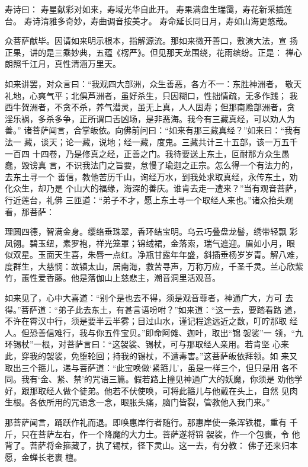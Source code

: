 寿诗曰：
寿星献彩对如来，寿域光华自此开。
寿果满盘生瑞霭，寿花新采插莲台。
寿诗清雅多奇妙，寿曲调音按美才。
寿命延长同日月，寿如山海更悠哉。

众菩萨献毕。因请如来明示根本，指解源流。那如来微开善口，敷演大法，宣
扬正果，讲的是三乘妙典，五蕴《楞严》。但见那天龙围绕，花雨缤纷。正是：
禅心朗照千江月，真性清涵万里天。

如来讲罢，对众言曰：“我观四大部洲，众生善恶，各方不一：东胜神洲者，
敬天礼地，心爽气平；北俱芦洲者，虽好杀生，只因糊口，性拙情疏，无多作践；
我西牛贺洲者，不贪不杀，养气潜灵，虽无上真，人人固寿；但那南赡部洲者，贪
淫乐祸，多杀多争，正所谓口舌凶场，是非恶海。我今有三藏真经，可以劝人为善。”
诸菩萨闻言，合掌皈依。向佛前问曰：“如来有那三藏真经？”如来曰：“我有法一
藏，谈天；论一藏，说地；经一藏，度鬼。三藏共计三十五部，该一万五千一百四
十四卷，乃是修真之经，正善之门。我待要送上东土，叵耐那方众生愚蠢，毁谤真
言，不识我法门之旨要，怠慢了瑜迦之正宗。怎么得一个有法力的，去东土寻一个
善信，教他苦历千山，询经万水，到我处求取真经，永传东土，劝化众生，却乃是
个山大的福缘，海深的善庆。谁肯去走一遭来？”当有观音菩萨，行近莲台，礼佛
三匝道：“弟子不才，愿上东土寻一个取经人来也。”诸众抬头观看，那菩萨：

理圆四德，智满金身。缨络垂珠翠，香环结宝明。乌云巧叠盘龙髻，绣带轻飘
彩凤翎。碧玉纽，素罗袍，祥光笼罩；锦绒裙，金落索，瑞气遮迎。眉如小月，眼
似双星。玉面天生喜，朱唇一点红。净瓶甘露年年盛，斜插垂杨岁岁青。解八难，
度群生，大慈悯：故镇太山，居南海，救苦寻声，万称万应，千圣千灵。兰心欣紫
竹，蕙性爱香藤。他是落伽山上慈悲主，潮音洞里活观音。

如来见了，心中大喜道：“别个是也去不得，须是观音尊者，神通广大，方可
去得。”菩萨道：“弟子此去东土，有甚言语吩咐？”如来道：“这一去，要踏看路
道，不许在霄汉中行，须是要半云半雾；目过山水，谨记程途远近之数，叮咛那取
经人。但恐善信难行，我与你五件宝贝。”即命阿傩、迦叶，取出“锦袈裟”一
领，“九环锡杖”一根，对菩萨言曰：“这袈裟、锡杖，可与那取经人亲用。若肯坚
心来此，穿我的袈裟，免堕轮回；持我的锡杖，不遭毒害。”这菩萨皈依拜领。如
来又取出三个箍儿，递与菩萨道：“此宝唤做‘紧箍儿’，虽是一样三个，但只是用
各不同。我有‘金、紧、禁’的咒语三篇。假若路上撞见神通广大的妖魔，你须是
劝他学好，跟那取经人做个徒弟。他若不伏使唤，可将此箍儿与他戴在头上，自然
见肉生根。各依所用的咒语念一念，眼胀头痛，脑门皆裂，管教他入我门来。”

那菩萨闻言，踊跃作礼而退。即唤惠岸行者随行。那惠岸使一条浑铁棍，重有
千斤，只在菩萨左右，作一个降魔的大力士。菩萨遂将锦袈裟，作一个包裹，令
他背了。菩萨将金箍藏了，执了锡杖，径下灵山。这一去，有分教：
佛子还来归本愿，金蝉长老裹檀。

